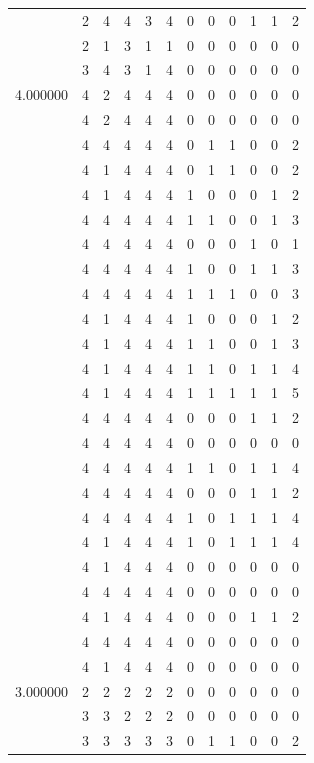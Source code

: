 \documentclass[]{book}
\theoremstyle{definition}
\theoremstyle{definition}
\theoremstyle{definition}
\theoremstyle{remark}
\begin{document}
\begin{table}
{\begin{tabular}[t]{rrrrrrrrrrrr}
 & 2 & 4 & 4 & 3 & 4 & 0 & 0 & 0 & 1 & 1 & 2\\
 & 2 & 1 & 3 & 1 & 1 & 0 & 0 & 0 & 0 & 0 & 0\\
 & 3 & 4 & 3 & 1 & 4 & 0 & 0 & 0 & 0 & 0 & 0\\
4.000000 & 4 & 2 & 4 & 4 & 4 & 0 & 0 & 0 & 0 & 0 & 0\\
 & 4 & 2 & 4 & 4 & 4 & 0 & 0 & 0 & 0 & 0 & 0\\
 & 4 & 4 & 4 & 4 & 4 & 0 & 1 & 1 & 0 & 0 & 2\\
 & 4 & 1 & 4 & 4 & 4 & 0 & 1 & 1 & 0 & 0 & 2\\
 & 4 & 1 & 4 & 4 & 4 & 1 & 0 & 0 & 0 & 1 & 2\\
 & 4 & 4 & 4 & 4 & 4 & 1 & 1 & 0 & 0 & 1 & 3\\
 & 4 & 4 & 4 & 4 & 4 & 0 & 0 & 0 & 1 & 0 & 1\\
 & 4 & 4 & 4 & 4 & 4 & 1 & 0 & 0 & 1 & 1 & 3\\
 & 4 & 4 & 4 & 4 & 4 & 1 & 1 & 1 & 0 & 0 & 3\\
 & 4 & 1 & 4 & 4 & 4 & 1 & 0 & 0 & 0 & 1 & 2\\
 & 4 & 1 & 4 & 4 & 4 & 1 & 1 & 0 & 0 & 1 & 3\\
 & 4 & 1 & 4 & 4 & 4 & 1 & 1 & 0 & 1 & 1 & 4\\
 & 4 & 1 & 4 & 4 & 4 & 1 & 1 & 1 & 1 & 1 & 5\\
 & 4 & 4 & 4 & 4 & 4 & 0 & 0 & 0 & 1 & 1 & 2\\
 & 4 & 4 & 4 & 4 & 4 & 0 & 0 & 0 & 0 & 0 & 0\\
 & 4 & 4 & 4 & 4 & 4 & 1 & 1 & 0 & 1 & 1 & 4\\
 & 4 & 4 & 4 & 4 & 4 & 0 & 0 & 0 & 1 & 1 & 2\\
 & 4 & 4 & 4 & 4 & 4 & 1 & 0 & 1 & 1 & 1 & 4\\
 & 4 & 1 & 4 & 4 & 4 & 1 & 0 & 1 & 1 & 1 & 4\\
 & 4 & 1 & 4 & 4 & 4 & 0 & 0 & 0 & 0 & 0 & 0\\
 & 4 & 4 & 4 & 4 & 4 & 0 & 0 & 0 & 0 & 0 & 0\\
 & 4 & 1 & 4 & 4 & 4 & 0 & 0 & 0 & 1 & 1 & 2\\
 & 4 & 4 & 4 & 4 & 4 & 0 & 0 & 0 & 0 & 0 & 0\\
 & 4 & 1 & 4 & 4 & 4 & 0 & 0 & 0 & 0 & 0 & 0\\
3.000000 & 2 & 2 & 2 & 2 & 2 & 0 & 0 & 0 & 0 & 0 & 0\\
 & 3 & 3 & 2 & 2 & 2 & 0 & 0 & 0 & 0 & 0 & 0\\
 & 3 & 3 & 3 & 3 & 3 & 0 & 1 & 1 & 0 & 0 & 2\\

\end{tabular}}
\end{table}
\end{document}
